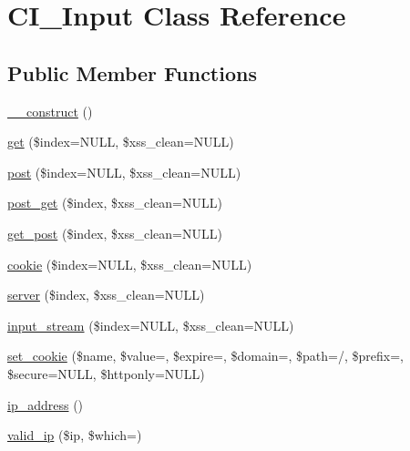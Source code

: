 \hypertarget{class_c_i___input}{}\section{C\+I\+\_\+\+Input Class Reference}
\label{class_c_i___input}
\subsection*{Public Member Functions}
\begin{DoxyCompactItemize}
\item 
\mbox{\hyperlink{class_c_i___input_a09ed00d5d4156941537b2bc5de39f6a8}{\+\_\+\+\_\+construct}} ()
\item 
\mbox{\hyperlink{class_c_i___input_a797c8c03c755b8c8e0e1a22cdb2ef180}{get}} (\$index=N\+U\+LL, \$xss\+\_\+clean=N\+U\+LL)
\item 
\mbox{\hyperlink{class_c_i___input_ae3472c7693aa86ca1591005bb7c59a00}{post}} (\$index=N\+U\+LL, \$xss\+\_\+clean=N\+U\+LL)
\item 
\mbox{\hyperlink{class_c_i___input_a732347d6dd58fddfeb2a69cc80b14dbf}{post\+\_\+get}} (\$index, \$xss\+\_\+clean=N\+U\+LL)
\item 
\mbox{\hyperlink{class_c_i___input_a4348808b6718f4d18545f3877a90959c}{get\+\_\+post}} (\$index, \$xss\+\_\+clean=N\+U\+LL)
\item 
\mbox{\hyperlink{class_c_i___input_a29310ccab79cedb2698ed2899e613ef7}{cookie}} (\$index=N\+U\+LL, \$xss\+\_\+clean=N\+U\+LL)
\item 
\mbox{\hyperlink{class_c_i___input_ad773b845762ebc2b44dc5e652376cf20}{server}} (\$index, \$xss\+\_\+clean=N\+U\+LL)
\item 
\mbox{\hyperlink{class_c_i___input_a4fc99e97be1f2eba0d9c7f915f9e6883}{input\+\_\+stream}} (\$index=N\+U\+LL, \$xss\+\_\+clean=N\+U\+LL)
\item 
\mbox{\hyperlink{class_c_i___input_a08e51fa067d4c79313706b0efaac5f80}{set\+\_\+cookie}} (\$name, \$value=\textquotesingle{}\textquotesingle{}, \$expire=\textquotesingle{}\textquotesingle{}, \$domain=\textquotesingle{}\textquotesingle{}, \$path=\textquotesingle{}/\textquotesingle{}, \$prefix=\textquotesingle{}\textquotesingle{}, \$secure=N\+U\+LL, \$httponly=N\+U\+LL)
\item 
\mbox{\hyperlink{class_c_i___input_a68157e630838fcfe411dcb008cc770c0}{ip\+\_\+address}} ()
\item 
\mbox{\hyperlink{class_c_i___input_a9adfe10bffecb48334f3727746b54aef}{valid\+\_\+ip}} (\$ip, \$which=\textquotesingle{}\textquotesingle{})

\end{DoxyCompactItemize}
